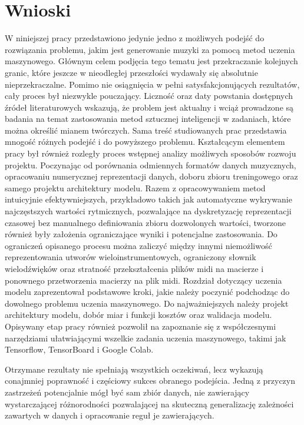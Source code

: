 \chapter{Wnioski}
{
    W niniejszej pracy przedstawiono jedynie jedno z możliwych podejść do rozwiązania problemu,
    jakim jest generowanie muzyki za pomocą metod uczenia maszynowego. Głównym celem podjęcia 
    tego tematu jest przekraczanie kolejnych granic, które jeszcze w nieodległej przeszłości
    wydawały się absolutnie nieprzekraczalne. Pomimo nie osiągnięcia w pełni satysfakcjonujących 
    rezultatów, cały proces był niezwykle pouczający. 
    Liczność oraz daty powstania dostępnych źródeł literaturowych wskazują, że problem jest aktualny 
    i wciąż prowadzone są badania na temat zastosowania metod sztucznej inteligencji w zadaniach, 
    które można określić mianem twórczych. Sama treść studiowanych prac przedstawia mnogość 
    różnych podejść i do powyższego problemu.
    Kształcącym elementem pracy był również rozległy proces wstępnej analizy możliwych sposobów
    rozwoju projektu. Poczynając od porównania odmiennych formatów danych muzycznych, opracowaniu 
    numerycznej reprezentacji danych, doboru zbioru treningowego oraz samego projektu architektury
    modelu. Razem z opracowywaniem metod intuicyjnie efektywniejszych, przykładowo takich jak automatyczne wykrywanie
    najczęstszych wartości rytmicznych, pozwalające na dyskretyzację reprezentacji czasowej bez
    manualnego definiowania zbioru dozwolonych wartości, tworzone również były założenia
    ograniczające wyniki i potencjalne zastosowania. Do ograniczeń opisanego procesu można 
    zaliczyć między innymi niemożliwość reprezentowania utworów wieloinstrumentowych, ograniczony 
    słownik wielodźwięków oraz stratność przekształcenia plików midi na macierze i ponownego przetworzenia
    macierzy na plik midi.
    Rozdział dotyczący uczenia modelu zaprezentował podstawowe kroki, jakie należy poczynić podchodząc do
    dowolnego problemu uczenia maszynowego. Do najważniejszych należy projekt architektury modelu,
    dobór miar i funkcji kosztów oraz walidacja modelu. Opisywany etap pracy również pozwolił na zapoznanie 
    się z współczesnymi narzędziami ułatwiającymi wszelkie zadania uczenia maszynowego, takimi jak Tensorflow, 
    TensorBoard i Google Colab. 

    Otrzymane rezultaty nie spełniają wszystkich oczekiwań, lecz wykazują conajmniej poprawność i częściowy
    sukces obranego podejścia. Jedną z przyczyn zastrzeżeń potencjalnie mógł być sam zbiór danych, nie 
    zawierający wystarczającej różnorodności pozwalającej na skuteczną generalizację zależności zawartych 
    w danych i opracowanie reguł je zawierających.

}
